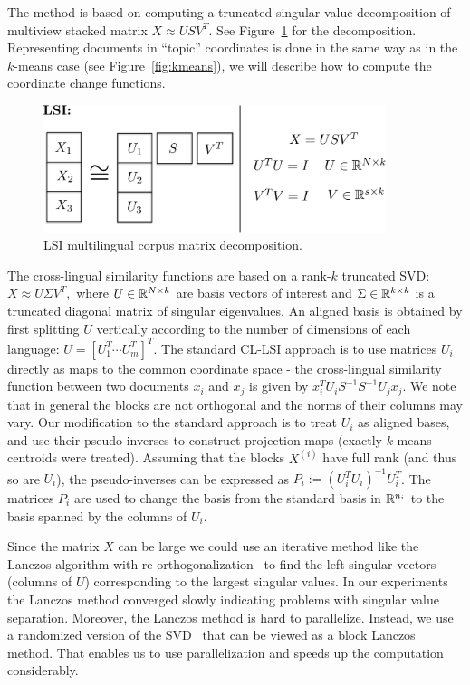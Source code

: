 The method is based on computing a truncated singular value decomposition of
multiview stacked matrix $X \approx U S V^T$. See Figure~\ref{fig:lsi} for the decomposition.
Representing documents in ``topic'' coordinates is done in the same way as in the $k$-means case
(see Figure~\ref{fig:kmeans}), we will describe how to compute the coordinate change functions.

\begin{figure}[tbp]
\centering
\includegraphics[width=10cm]{figures/lsi.pdf}
\caption{LSI multilingual corpus matrix decomposition.}
\label{fig:lsi}
\end{figure}

The cross-lingual similarity functions are based on a rank-$k$ truncated SVD:
$X \approx U \Sigma V^T,$ where $U \in \mathbb{R}^{N \times k}$ are basis vectors of
interest and $\Sigma \in \mathbb{R}^{k \times k}$ is a truncated diagonal matrix of singular
eigenvalues. An aligned basis is obtained by first splitting $U$ vertically according
to the number of dimensions of each language: $U = [U_1^T \cdots U_m^T]^T$.
The standard CL-LSI approach is to use matrices $U_i$ directly as maps to the common
coordinate space - the cross-lingual similarity function between two documents $x_i$ and
$x_j$ is given by $x_i^T U_i S^{-1} S^{-1} U_j x_j$. We note that in general the blocks
are not orthogonal and the norms of their columns may vary. Our modification to the
standard approach is to treat $U_i$ as aligned bases, and use their pseudo-inverses
to construct projection maps (exactly $k$-means centroids were treated). Assuming
that the blocks $X^{(i)}$ have full rank (and thus so are $U_i$), the pseudo-inverses can be expressed as $P_i := (U_i^T U_i)^{-1} U_i^T$.
The matrices $P_i$ are used to change the basis from the standard basis in $\mathbb{R}^{n_i}$ to the
basis spanned by the columns of $U_i$.

Since the matrix $X$ can be large we could use an iterative method like the Lanczos
algorithm with re-orthogonalization~\cite{golub} to find the left singular vectors
(columns of $U$) corresponding to the largest singular values. In our experiments
the Lanczos method converged slowly indicating problems with singular value separation. 
Moreover, the Lanczos method is hard to parallelize. Instead, we use a randomized version
of the SVD~\cite{tropp} that can be viewed as a block Lanczos method. That enables us
to use parallelization and speeds up the computation considerably.

